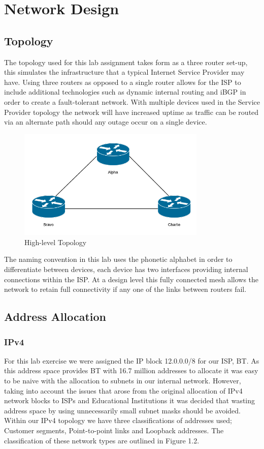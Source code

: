 \chapter{Network Design}

\section{Topology}

The topology used for this lab assignment takes form as a three router set-up, this simulates the infrastructure that a typical Internet Service Provider may have. Using three routers as opposed to a single router allows for the ISP to include additional technologies such as dynamic internal routing and iBGP in order to create a fault-tolerant network. With multiple devices used in the Service Provider topology the network will have increased uptime as traffic can be routed via an alternate path should any outage occur on a single device.

\begin{figure}[h!]
	\caption{High-level Topology}
	\centering
	\includegraphics[width=0.8\textwidth]{images/networkTopology.png}
\end{figure}

The naming convention in this lab uses the phonetic alphabet in order to differentiate between devices, each device has two interfaces providing internal connections within the ISP. At a design level this fully connected mesh allows the network to retain full connectivity if any one of the links between routers fail.

\section{Address Allocation}
\subsection{IPv4}
For this lab exercise we were assigned the IP block 12.0.0.0/8 for our ISP, BT. As this address space provides BT with 16.7 million addresses to allocate it was easy to be naive with the allocation to subnets in our internal network. However, taking into account the issues that arose from the original allocation of IPv4 network blocks to ISPs and Educational Institutions it was decided that wasting address space by using unnecessarily small subnet masks should be avoided. Within our IPv4 topology we have three classifications of addresses used; Customer segments, Point-to-point links and Loopback addresses. The classification of these network types are outlined in Figure 1.2.


